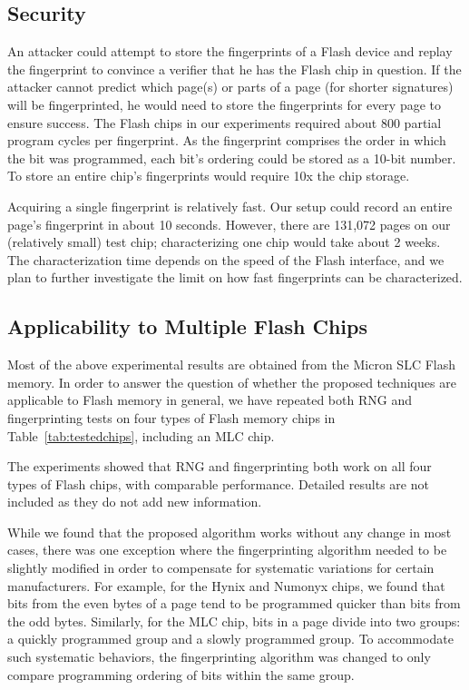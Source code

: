 \subsection{Security}

An attacker could attempt to store the fingerprints of a Flash device and replay the fingerprint to convince a verifier that he has the Flash chip in question. If the attacker cannot predict which page(s) or parts of a page (for shorter signatures) will be fingerprinted, he would need to store the fingerprints for every page to ensure success. The Flash chips in our experiments required about 800 partial program cycles per fingerprint. As the fingerprint comprises the order in which the bit was programmed, each bit’s ordering could be stored as a 10-bit number. To store an entire chip’s fingerprints would require 10x the chip storage. 

Acquiring a single fingerprint is relatively fast. Our setup could record an entire page’s fingerprint in about 10 seconds. However, there are 131,072 pages on our (relatively small) test chip; characterizing one chip would take about 2 weeks. The characterization time depends on the speed of the Flash interface, and we plan to further investigate the limit on how fast fingerprints can be characterized. 

\subsection{Applicability to Multiple Flash Chips}

Most of the above experimental results are obtained from the Micron SLC Flash memory. In order to answer the question of whether the proposed techniques are applicable to Flash memory in general, we have repeated both RNG and fingerprinting tests on four types of Flash memory chips in Table~\ref{tab:testedchips}, including an MLC chip.

The experiments showed that RNG and fingerprinting both work on all four types of Flash chips, with comparable performance. Detailed results are not included as they do not add new information. 

While we found that the proposed algorithm works without any change in most cases, there was one exception where the fingerprinting algorithm needed to be slightly modified in order to compensate for systematic variations for certain manufacturers. For example, for the Hynix and Numonyx chips, we found that bits from the even bytes of a page tend to be programmed quicker than bits from the odd bytes. Similarly, for the MLC chip, bits in a page divide into two groups: a quickly programmed group and a slowly programmed group. To accommodate such systematic behaviors, the fingerprinting algorithm was changed to only compare programming ordering of bits within the same group. 

